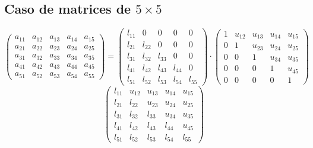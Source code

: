 \documentclass[10pt,a4paper,dvipdfmx]{article}
\begin{document}
\subsection{Caso de matrices de $5\times 5$ }
$$ \left( 
\begin{array}{ccccc}
a_{{1}{1}} & a_{{1}{2}} & a_{{1}{3}} & a_{{1}{4}} & a_{{1}{5}} \\
a_{{2}{1}} & a_{{2}{2}} & a_{{2}{3}} & a_{{2}{4}} & a_{{2}{5}} \\
a_{{3}{1}} & a_{{3}{2}} & a_{{3}{3}} & a_{{3}{4}} & a_{{3}{5}} \\
a_{{4}{1}} & a_{{4}{2}} & a_{{4}{3}} & a_{{4}{4}} & a_{{4}{5}} \\
a_{{5}{1}} & a_{{5}{2}} & a_{{5}{3}} & a_{{5}{4}} & a_{{5}{5}} 
 \end{array}
\right)
 = \left( 
\begin{array}{ccccc}
l_{{1}{1}} & 0 & 0 & 0 & 0 \\
l_{{2}{1}} & l_{{2}{2}} & 0 & 0 & 0 \\
l_{{3}{1}} & l_{{3}{2}} & l_{{3}{3}} & 0 & 0 \\
l_{{4}{1}} & l_{{4}{2}} & l_{{4}{3}} & l_{{4}{4}} & 0 \\
l_{{5}{1}} & l_{{5}{2}} & l_{{5}{3}} & l_{{5}{4}} & l_{{5}{5}} 
 \end{array}
\right)
 \cdot \left( 
\begin{array}{ccccc}
1 & u_{{1}{2}} & u_{{1}{3}} & u_{{1}{4}} & u_{{1}{5}} \\
0 & 1 & u_{{2}{3}} & u_{{2}{4}} & u_{{2}{5}} \\
0 & 0 & 1 & u_{{3}{4}} & u_{{3}{5}} \\
0 & 0 & 0 & 1 & u_{{4}{5}} \\
0 & 0 & 0 & 0 & 1 
 \end{array}
\right)
 $$
$$ \left( 
\begin{array}{ccccc}
l_{{1}{1}} & u_{{1}{2}} & u_{{1}{3}} & u_{{1}{4}} & u_{{1}{5}} \\
l_{{2}{1}} & l_{{2}{2}} & u_{{2}{3}} & u_{{2}{4}} & u_{{2}{5}} \\
l_{{3}{1}} & l_{{3}{2}} & l_{{3}{3}} & u_{{3}{4}} & u_{{3}{5}} \\
l_{{4}{1}} & l_{{4}{2}} & l_{{4}{3}} & l_{{4}{4}} & u_{{4}{5}} \\
l_{{5}{1}} & l_{{5}{2}} & l_{{5}{3}} & l_{{5}{4}} & l_{{5}{5}} 
 \end{array}
\right)
 $$
\end{document}
